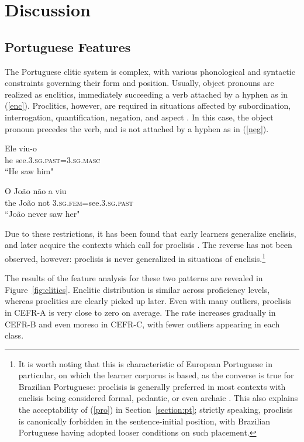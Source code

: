 \section{Discussion}
\label{section:discussion}

\subsection{Portuguese Features}

The Portuguese clitic system is complex, with various phonological and syntactic constraints governing their form and position. Usually, object pronouns are realized as enclitics, immediately succeeding a verb attached by a hyphen as in (\ref{enc}). Proclitics, however, are required in situations affected by subordination, interrogation, quantification, negation, and aspect \citep{flores2014}. In this case, the object pronoun precedes the verb, and is not attached by a hyphen as in (\ref{neg}).

\begin{exe}
\ex\label{enc}
\gll Ele viu-o \\
he see.{\scshape 3.sg.past}={\scshape 3.sg.masc}\\
\glt ``He saw him" \citep{flores2014}

\ex\label{neg}
\gll O João não {a viu} \\
the João not {\scshape 3.sg.fem}=see.{\scshape 3.sg.past} \\
\glt ``João never saw her" \citep{flores2014}
\end{exe}

Due to these restrictions, it has been found that early learners generalize enclisis, and later acquire the contexts which call for proclisis \citep{flores2014}. The reverse has not been observed, however: proclisis is never generalized in situations of enclisis.\footnote{It is worth noting that this is characteristic of European Portuguese in particular, on which the learner corporus is based, as the converse is true for Brazilian Portuguese: proclisis is generally preferred in most contexts with enclisis being considered formal, pedantic, or even archaic \citep{galves2005, simoes2006}. This also explains the acceptability of (\ref{pro}) in Section~\ref{section:pt}; strictly speaking, proclisis is canonically forbidden in the sentence-initial position, with Brazilian Portuguese having adopted looser conditions on such placement.}

The results of the feature analysis for these two patterns are revealed in Figure~\ref{fig:clitics}. Enclitic distribution is similar across proficiency levels, whereas proclitics are clearly picked up later. Even with many outliers, proclisis in CEFR-A is very close to zero on average. The rate increases gradually in CEFR-B and even moreso in CEFR-C, with fewer outliers appearing in each class.

